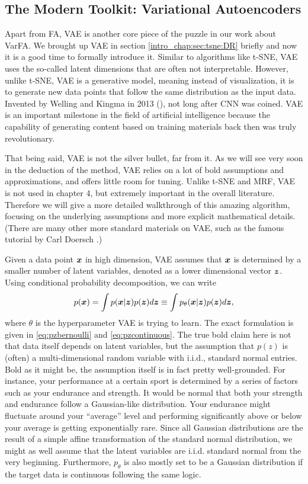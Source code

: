 \subsection{The Modern Toolkit: Variational Autoencoders} \label{intro_chap:sec:VarFA:sec:VAE}
Apart from FA, VAE is another core piece of the puzzle in our work about VarFA.
We brought up VAE in section \ref{intro_chap:sec:tsne:DR} briefly and now it is
a good time to formally introduce it. Similar to algorithms like t-SNE, VAE
uses the so-called latent dimensions that are often not interpretable. However,
unlike t-SNE, VAE is a generative model, meaning instead of visualization, it
is to generate new data points that follow the same distribution as the input
data. Invented by Welling and Kingma in 2013 (\cite{kingma2013auto}), not long
after CNN was coined. VAE is an important milestone in the field of artificial
intelligence because the capability of generating content based on training
materials back then was truly revolutionary.

That being said, VAE is not the silver bullet, far from it. As we will see very
soon in the deduction of the method, VAE relies on a lot of bold assumptions
and approximations, and offers little room for tuning. Unlike t-SNE and MRF,
VAE is not used in chapter 4, but extremely important in the overall
literature. Therefore we will give a more detailed walkthrough of this amazing
algorithm, focusing on the underlying assumptions and more explicit
mathematical details. (There are many other more standard materials on VAE,
such as the famous tutorial by Carl Doersch
\cite{doersch2021tutorialvariationalautoencoders}.)

Given a data point $\boldsymbol{x}$ in high dimension, VAE assumes that $\boldsymbol{x}$ is
determined by a smaller number of latent variables, denoted as a lower
dimensional vector $\boldsymbol{z}$. Using conditional probability decomposition, we can
write
\begin{align}
    p(\boldsymbol{x}) = \int p(\boldsymbol{x}|\boldsymbol{z})p(\boldsymbol{z})d\boldsymbol{z} \equiv \int p_{\theta}(\boldsymbol{x}|\boldsymbol{z})p(\boldsymbol{z})d\boldsymbol{z},
\end{align}
where $\theta$ is the hyperparameter VAE is trying to learn. The exact formulation is given in \eqref{eq:pzbernoulli} and \eqref{eq:pzcontinuous}. The true bold claim here is not that data itself depends on latent variables, but the assumption that $p(z)$ is (often) a multi-dimensional random variable with i.i.d., standard normal entries. Bold as it might be, the assumption itself is in fact pretty well-grounded. For instance, your performance at a certain sport is determined by a series of factors such as your endurance and strength. It would be normal that both your strength and endurance follow a Gaussian-like distribution. Your endurance might fluctuate around your ``average'' level and performing significantly above or below your average is getting exponentially rare. Since all Gaussian distributions are the result of a simple affine transformation of the standard normal distribution, we might as well assume that the latent variables are i.i.d. standard normal from the very beginning. Furthermore, $p_{\theta}$ is also mostly set to be a Gaussian distribution if the target data is continuous following the same logic.

